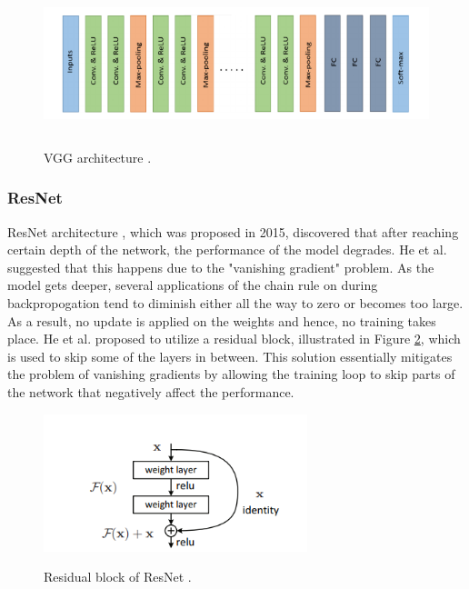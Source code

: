 \begin{figure}[htb]
	\begin{center}
		\includegraphics[height=4cm]{./vgg.png}
	\end{center}
	\caption{VGG architecture \cite{alom01}.}
	\begin{center}
		\label{VGG}
	\end{center}
\end{figure}
\FloatBarrier

\subsubsection{ResNet}
ResNet architecture \cite{He2015}, which was proposed in 2015, discovered that after reaching certain depth of the network, the performance of the model degrades. He et al. \cite{He2015} suggested that this happens due to the "vanishing gradient" problem. As the model gets deeper, several applications of the chain rule on during backpropogation tend to diminish either all the way to zero or becomes too large. As a result, no update is applied on the weights and hence, no training takes place. He et al. proposed to utilize a residual block, illustrated in Figure \ref{resnet}, which is used to skip some of the layers in between.  This solution essentially mitigates the problem of vanishing gradients by allowing the training loop to skip parts of the network that negatively affect the performance.

\begin{figure}[htb]
	\begin{center}
		\includegraphics[height=4cm]{./resnet.png}
	\end{center}
	\caption{Residual block of ResNet \cite{He2015}.}
	\begin{center}
		\label{resnet}
	\end{center}
\end{figure}
\FloatBarrier

